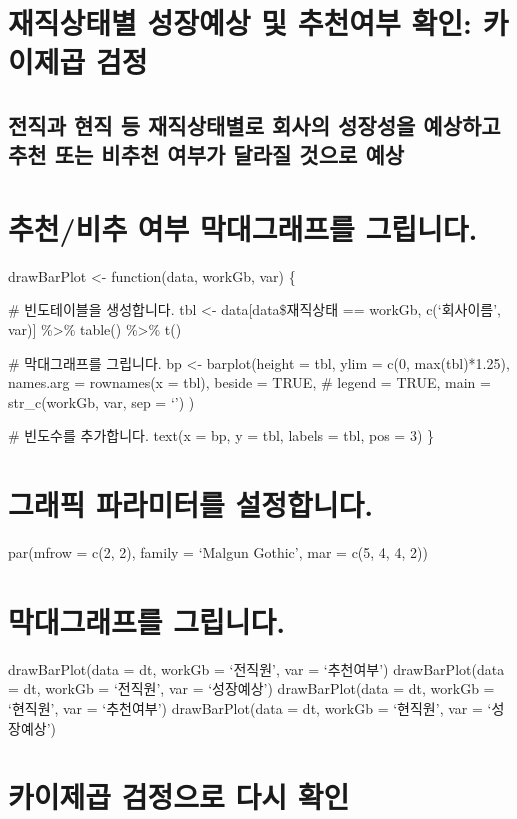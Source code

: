\documentclass[]{article}
\begin{document}
\section{재직상태별 성장예상 및 추천여부 확인: 카이제곱
검정}\label{------}

\subsection{전직과 현직 등 재직상태별로 회사의 성장성을 예상하고 추천
또는 비추천 여부가 달라질 것으로 예상}\label{-------------}

\section{추천/비추 여부 막대그래프를 그립니다.}\label{---.}

drawBarPlot \textless{}- function(data, workGb, var) \{

\# 빈도테이블을 생성합니다. tbl \textless{}- data{[}data\$재직상태 ==
workGb, c(`회사이름', var){]} \%\textgreater{}\% table()
\%\textgreater{}\% t()

\# 막대그래프를 그립니다. bp \textless{}- barplot(height = tbl, ylim =
c(0, max(tbl)*1.25), names.arg = rownames(x = tbl), beside = TRUE, \#
legend = TRUE, main = str\_c(workGb, var, sep = `') )

\# 빈도수를 추가합니다. text(x = bp, y = tbl, labels = tbl, pos = 3) \}

\section{그래픽 파라미터를 설정합니다.}\label{--.}

par(mfrow = c(2, 2), family = `Malgun Gothic', mar = c(5, 4, 4, 2))

\section{막대그래프를 그립니다.}\label{-.}

drawBarPlot(data = dt, workGb = `전직원', var = `추천여부')
drawBarPlot(data = dt, workGb = `전직원', var = `성장예상')
drawBarPlot(data = dt, workGb = `현직원', var = `추천여부')
drawBarPlot(data = dt, workGb = `현직원', var = `성장예상')

\section{카이제곱 검정으로 다시 확인}\label{---}
\end{document}
